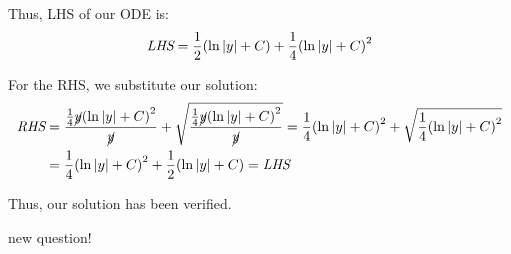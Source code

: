 \documentclass{article}
\begin{document}
Thus, LHS of our ODE is:
\begin{equation*}
    \lhs = \frac{1}{2} \parens*{\ln{\abs*{y}} + C} + \frac{1}{4} \parens*{\ln{\abs*{y}} + C}^2
\end{equation*}

For the RHS, we substitute our solution:
\begin{align*}
    \rhs
        &= \frac{\frac{1}{4} \cancel{y} \parens*{\ln{\abs*{y}} + C}^2}{\cancel{y}} + \sqrt{\frac{\frac{1}{4} \cancel{y} \parens*{\ln{\abs*{y}} + C}^2}{\cancel{y}}}
        = \frac{1}{4} \parens*{\ln{\abs*{y}} + C}^2 + \sqrt{\frac{1}{4} \parens*{\ln{\abs*{y}} + C}^2} \\
        &= \frac{1}{4} \parens*{\ln{\abs*{y}} + C}^2 + \frac{1}{2} \parens*{\ln{\abs*{y}} + C} = \lhs
\end{align*}

Thus, our solution has been verified.



\newpage

\begin{QuestionFrame}
    new question!
\end{QuestionFrame}
\end{document}
